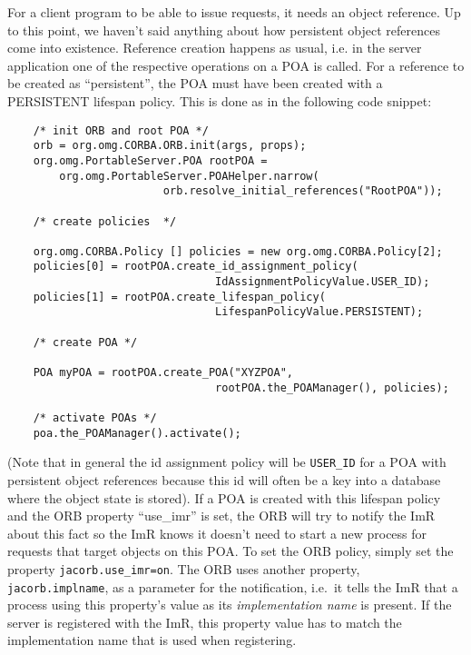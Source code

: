 \documentclass[12pt]{scrbook}
\begin{document}
For a client program to be  able to issue requests, it needs an object
reference.  Up to  this  point,  we haven't  said  anything about  how
persistent object  references come into  existence. Reference creation
happens as usual, i.e. in the server application one of the respective
operations  on a  POA is  called.  For a  reference to  be created  as
``persistent'',  the POA  must  have been  created  with a  PERSISTENT
lifespan policy. This is done as in the following code snippet:

\small{
\begin{verbatim}
    /* init ORB and root POA */
    orb = org.omg.CORBA.ORB.init(args, props);
    org.omg.PortableServer.POA rootPOA = 
        org.omg.PortableServer.POAHelper.narrow(
                        orb.resolve_initial_references("RootPOA"));

    /* create policies  */

    org.omg.CORBA.Policy [] policies = new org.omg.CORBA.Policy[2];
    policies[0] = rootPOA.create_id_assignment_policy(
                                IdAssignmentPolicyValue.USER_ID);
    policies[1] = rootPOA.create_lifespan_policy(
                                LifespanPolicyValue.PERSISTENT);

    /* create POA */

    POA myPOA = rootPOA.create_POA("XYZPOA", 
                                rootPOA.the_POAManager(), policies);

    /* activate POAs */                              
    poa.the_POAManager().activate();

\end{verbatim}
}

(Note that in general the  id assignment policy will be {\tt USER\_ID}
for a POA with persistent object references because this id will often
be a key into  a database where the object state is  stored). If a POA
is created with this lifespan policy and the ORB property ``use\_imr''
is set, the ORB will try to  notify the ImR about this fact so the ImR
knows it doesn't need to start  a new process for requests that target
objects on this  POA.  To set the ORB policy,  simply set the property
{\tt  jacorb.use\_imr=on}.   The   ORB  uses  another  property,  {\tt
jacorb.implname}, as  a parameter for the  notification, i.e.~it tells
the  ImR  that a  process  using this  property's  value  as its  {\em
implementation name} is present. If  the server is registered with the
ImR, this property value has  to match the implementation name that is
used when registering.
\end{document}
